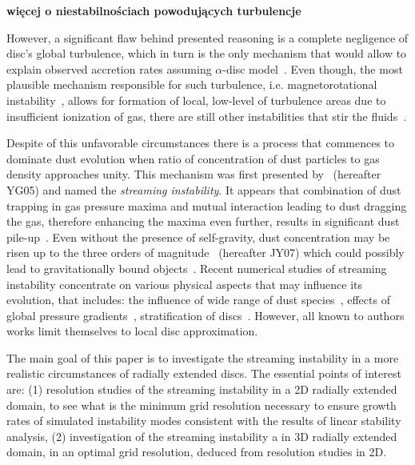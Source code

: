 {\bf więcej o niestabilnościach powodujących turbulencje}

\par 
\par However, a significant flaw behind presented reasoning is a complete
negligence of disc's global turbulence, which in turn is the only mechanism that
would allow to explain observed accretion rates assuming $\alpha$-disc
model~\citep{SS73}. Even though, the most plausible mechanism responsible for
such turbulence, i.e. magnetorotational instability~\citep{BH98}, allows for
formation of local, low-level of turbulence areas due to insufficient ionization
of gas, there are still other instabilities that stir the fluids~\citep{LP10}.

\par Despite of this unfavorable circumstances there is a process that commences
to dominate dust evolution when ratio of concentration of dust particles to gas
density approaches unity. This mechanism was first presented by~\cite{YG05}
(hereafter YG05) and named the {\it streaming instability}. It appears that
combination of dust trapping in gas pressure maxima and mutual interaction
leading to dust dragging the gas, therefore enhancing the maxima even further,
results in significant dust pile-up~\citep{J11}. Even without the presence of
self-gravity, dust concentration may be risen up to the three orders of
magnitude~\citep{JY07} (hereafter JY07) which could possibly lead to
gravitationally bound objects~\citep{J07}. Recent numerical studies of
streaming instability concentrate on various physical aspects that may influence
its evolution, that includes: the influence of wide range of dust
species~\citep{BS10a}, effects of global pressure gradients~\citep{BS10b},
stratification of discs~\citep{T12}. However, all known to authors works limit
themselves to local disc approximation. 

The main goal of this paper is to investigate the streaming instability in a
more realistic circumstances of radially extended discs. The essential points of
interest are:
(1) resolution studies of the streaming instability in a 2D radially extended
domain,  to see what is the minimum  grid resolution necessary to ensure growth
rates of  simulated instability modes consistent with the results of linear
stability analysis, (2) investigation of the streaming instability a in 3D
radially extended domain, in an optimal  grid resolution,  deduced from
resolution studies in 2D.

